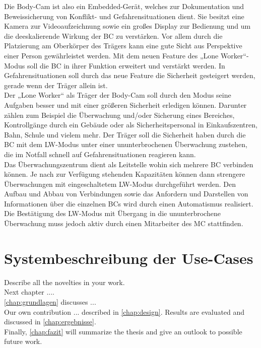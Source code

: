 \documentclass[thesis.tex]{subfiles}
\begin{document}
Die Body-Cam ist also ein Embedded-Gerät, welches zur Dokumentation und Beweissicherung von Konflikt- und Gefahrensituationen dient.
Sie besitzt eine Kamera zur Videoaufzeichnung sowie ein großes Display zur Bedienung und um die deeskalierende Wirkung der BC zu verstärken.
Vor allem durch die Platzierung am Oberkörper des Trägers kann eine gute Sicht aus Perspektive einer Person gewährleistet werden.
Mit dem neuen Feature des „Lone Worker“-Modus soll die BC in ihrer Funktion erweitert und verstärkt werden.
In Gefahrensituationen soll durch das neue Feature die Sicherheit gesteigert werden, gerade wenn der Träger allein ist.
\\

Der „Lone Worker“ als Träger der Body-Cam soll durch den Modus seine Aufgaben besser und mit einer größeren Sicherheit erledigen können.
Darunter zählen zum Beispiel die Überwachung und/oder Sicherung eines Bereiches, Kontrollgänge durch ein Gebäude oder
als Sicherheitspersonal in Einkaufszentren, Bahn, Schule und vielem mehr.
Der Träger soll die Sicherheit haben durch die BC mit dem LW-Modus unter einer ununterbrochenen Überwachung zustehen,
die im Notfall schnell auf Gefahrensituationen reagieren kann.
\\

Das Überwachungszentrum dient als Leitstelle wohin sich mehrere BC verbinden können.
Je nach zur Verfügung stehenden Kapazitäten können dann strengere Überwachungen mit eingeschaltetem LW-Modus durchgeführt werden.
Den Aufbau und Abbau von Verbindungen sowie das Anfordern und Darstellen von Informationen über die einzelnen BCs wird
durch einen Automatismus realisiert.
Die Bestätigung des LW-Modus mit Übergang in die ununterbrochene Überwachung muss jedoch aktiv durch einen Mitarbeiter des MC stattfinden.
\\


\section{Systembeschreibung der Use-Cases}
Describe all the novelties in your work.
\\
Next chapter ....
\\
\autoref{chap:grundlagen} discusses ...
\\
Our own contribution ... described in \autoref{chap:design}.
Results are evaluated and discussed in \autoref{chap:ergebnisse}.
\\
Finally, \autoref{chap:fazit} will summarize the thesis and give an outlook to possible future work.

\subfilebib %
\end{document}
